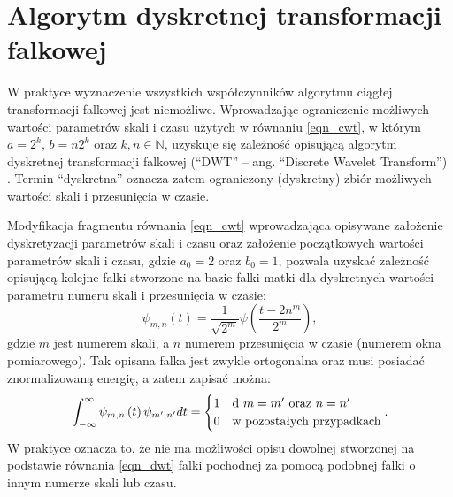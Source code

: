 \section{Algorytm dyskretnej transformacji falkowej}

W praktyce wyznaczenie wszystkich współczynników algorytmu ciągłej transformacji falkowej jest niemożliwe. Wprowadzając ograniczenie możliwych wartości parametrów skali i czasu użytych w równaniu \eqref{eqn_cwt}, w którym $a = 2^k$, $b = n2^k$ oraz $k, n \in \mathbb{N}$, uzyskuje się zależność opisującą algorytm dyskretnej transformacji falkowej (\enquote{DWT} -- ang. \enquote{Discrete Wavelet Transform}) \cite{wallen_handbook}. Termin \enquote{dyskretna} oznacza zatem ograniczony (dyskretny) zbiór możliwych wartości skali i przesunięcia w czasie.

Modyfikacja fragmentu równania \eqref{eqn_cwt} wprowadzająca opisywane założenie dyskretyzacji parametrów skali i czasu oraz założenie początkowych wartości parametrów skali i czasu, gdzie $a_0 = 2$ oraz $b_0 = 1$, pozwala uzyskać zależność opisującą kolejne falki stworzone na bazie falki-matki dla dyskretnych wartości parametru numeru skali i przesunięcia w czasie:
\begin{equation}
\psi_{m,n} \left( t \right) = \frac{1}{\sqrt{2^m}} \psi \left( \frac{t-2n^m}{2^m} \right) \label{eqn_dwt_wavelet},
\end{equation}
gdzie $m$ jest numerem skali, a $n$ numerem przesunięcia w czasie (numerem okna pomiarowego). Tak opisana falka jest zwykle ortogonalna oraz musi posiadać znormalizowaną energię, a zatem zapisać można:
\begin{equation}
\int _{-\infty} ^{\infty} \psi_{m,n} \left( t \right) \psi_{m',n'} dt =
\begin{cases}
	1 & $d $ m = m' $ oraz $ n = n' \\
	0 & $w pozostałych przypadkach$
\end{cases}
\label{eqn_dwt_orthogonal}.
\end{equation}
W praktyce oznacza to, że nie ma możliwości opisu dowolnej stworzonej na podstawie równania \eqref{eqn_dwt} falki pochodnej za pomocą podobnej falki o innym numerze skali lub czasu.

